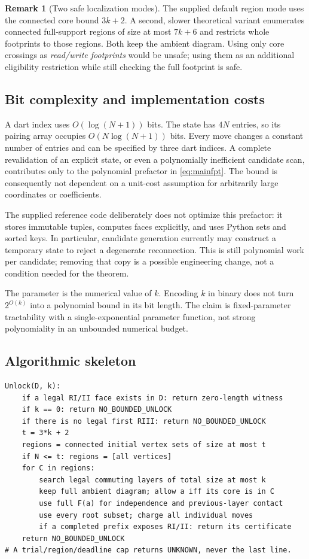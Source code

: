 \documentclass[11pt]{article}
\theoremstyle{definition}
\newtheorem{remark}[theorem]{Remark}
\begin{document}
\begin{remark}[Two safe localization modes]
The supplied default region mode uses the connected core bound $3k+2$.
A second, slower theoretical variant enumerates connected full-support
regions of size at most $7k+6$ and restricts whole footprints to those
regions. Both keep the ambient diagram. Using only core crossings as
\emph{read/write footprints} would be unsafe; using them as an additional
eligibility restriction while still checking the full footprint is safe.
\end{remark}

\subsection{Bit complexity and implementation costs}

A dart index uses $O(\log(N+1))$ bits. The state has $4N$ entries, so its
pairing array occupies $O(N\log(N+1))$ bits. Every move changes a constant
number of entries and can be specified by three dart indices. A complete
revalidation of an explicit state, or even a polynomially inefficient
candidate scan, contributes only to the polynomial prefactor in
\eqref{eq:mainfpt}. The bound is consequently not dependent on a
unit-cost assumption for arbitrarily large coordinates or coefficients.

The supplied reference code deliberately does not optimize this prefactor:
it stores immutable tuples, computes faces explicitly, and uses Python
sets and sorted keys. In particular, candidate generation currently may
construct a temporary state to reject a degenerate reconnection. This is
still polynomial work per candidate; removing that copy is a possible
engineering change, not a condition needed for the theorem.

The parameter is the numerical value of $k$. Encoding $k$ in binary does
not turn $2^{O(k)}$ into a polynomial bound in its bit length. The claim
is fixed-parameter tractability with a single-exponential parameter
function, not strong polynomiality in an unbounded numerical budget.

\subsection{Algorithmic skeleton}

\begin{lstlisting}
Unlock(D, k):
    if a legal RI/II face exists in D: return zero-length witness
    if k == 0: return NO_BOUNDED_UNLOCK
    if there is no legal first RIII: return NO_BOUNDED_UNLOCK
    t = 3*k + 2
    regions = connected initial vertex sets of size at most t
    if N <= t: regions = [all vertices]
    for C in regions:
        search legal commuting layers of total size at most k
        keep full ambient diagram; allow a iff its core is in C
        use full F(a) for independence and previous-layer contact
        use every root subset; charge all individual moves
        if a completed prefix exposes RI/II: return its certificate
    return NO_BOUNDED_UNLOCK
# A trial/region/deadline cap returns UNKNOWN, never the last line.
\end{lstlisting}
\end{document}
